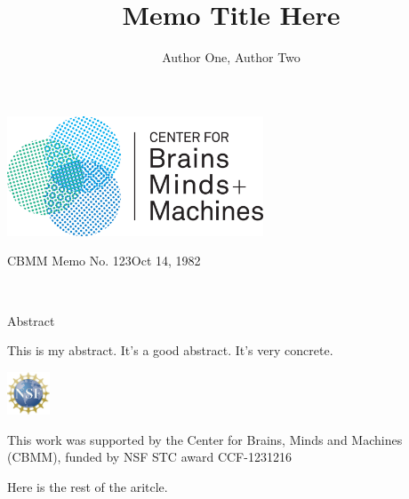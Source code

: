 \documentclass[12pt,titlepage]{article}
\title{Memo Title Here}         %
\author{Author One, Author Two} %
\begin{document}
\begin{titlingpage}
\begin{center}
  \includegraphics[width=3in]{cbmm2}
\end{center}
\vspace{40pt}
\noindent
\begin{large}
  CBMM Memo No. 123\hfill Oct 14, 1982
\end{large}
\vspace{20pt}
\begin{center}
  \begin{huge}\thetitle \end{huge}
  \\
  \vspace{20pt}
  \begin{large}\theauthor \end{large}
\end{center}
\begin{center}
  \begin{large} \begin{bfseries} Abstract \end{bfseries} \end{large}
\end{center}

This is my abstract. It's a good abstract. It's very concrete. \lipsum[1] \lipsum[2]


\vfill
\begin{minipage}{0.05\textwidth}
\includegraphics[width=0.5in]{nsf4}
\end{minipage}
\hfill
\begin{minipage}{0.80\textwidth}
  \begin{large}
    This work was supported by the Center for Brains, Minds and
    Machines (CBMM), funded by NSF STC award CCF-1231216
  \end{large}
\end{minipage}

\end{titlingpage}

Here is the rest of the aritcle. \lipsum[1] %
\end{document}
